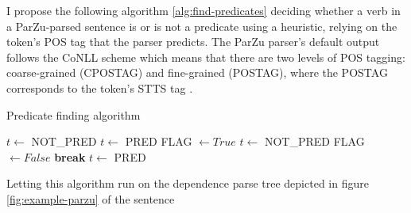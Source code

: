 

I propose the following algorithm \ref{alg:find-predicates} deciding whether a verb in a
ParZu-parsed sentence is or is not a predicate using a heuristic, relying on the token's
POS tag that the parser predicts. The ParZu parser's default output follows the CoNLL
scheme \citep{buchholz2006conll} which means that there are two levels of POS tagging:
coarse-grained (CPOSTAG) and fine-grained (POSTAG), where the POSTAG corresponds to the
token's STTS tag \citep{schiller1999guidelines}.

\begin{algorithm}
\caption{Predicate finding algorithm}
\label{alg:find-predicates}
	\begin{algorithmic}[1]
			\STATE $t \leftarrow$ NOT\_PRED
		\ELSE
				\STATE $t \leftarrow$ PRED
			\ELSE
				\STATE FLAG $\leftarrow True$
						\STATE $t \leftarrow$ NOT\_PRED
						\STATE FLAG $\leftarrow False$
						\STATE \textbf{break}
					\ENDIF
				\ENDFOR
				\IF{FLAG $= True$}
					\STATE $t \leftarrow$ PRED
				\ENDIF
			\ENDIF
		\ENDIF
	\ENDFOR
\end{algorithmic}
\end{algorithm}


Letting this algorithm run on the dependence parse tree depicted in figure \ref{fig:example-parzu}
of the sentence

